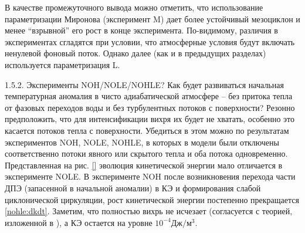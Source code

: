 В качестве промежуточного вывода можно отметить, что использование параметризации Миронова (эксперимент M) дает более устойчивый мезоциклон и менее “взрывной” его рост в конце эксперимента. По-видимому, различия в экспериментах сгладятся при условии, что атмосферные условия будут включать ненулевой фоновый поток. Однако далее (как и в предыдущих разделах) используется параметризация L.

1.5.2.	Эксперименты NOH/NOLE/NOHLE?
Как будет развиваться начальная температурная аномалия в чисто адиабатической атмосфере – без притока тепла от фазовых переходов воды и без турбулентных потоков с поверхности? Резонно предположить, что для интенсификации вихря их будет не хватать, особенно это касается потоков тепла с поверхности. Убедиться в этом можно по результатам экспериментов NOH, NOLE, NOHLE, в которых в модели были отключены соответственно потоки явного или скрытого тепла и оба потока одновременно. Представленная на рис. \ref{} эволюция кинетической энергии мало отличается в эксперименте NOLE. В эксперименте NOH после возникновения перехода части ДПЭ (запасенной в начальной аномалии) в КЭ и формирования слабой циклонической циркуляции, рост кинетической энергии постепенно прекращается \ref{nohle:dkdt}. Заметим, что полностью вихрь не исчезает (согласуется с теорией, изложенной в \cite{RT2003}), а КЭ остается на уровне $10^{-4} Дж/м^{3}$. 

